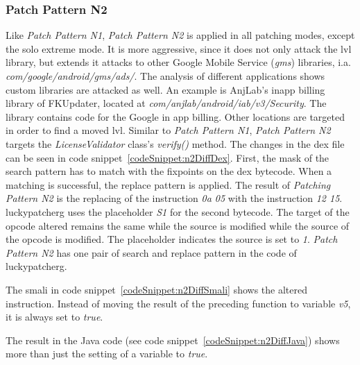 \subsubsection{Patch Pattern N2}
Like \textit{Patch Pattern N1}, \textit{Patch Pattern N2} is applied in all patching modes, except the solo extreme mode.
It is more aggressive, since it does not only attack the \gls{lvl} library, but extends it attacks to other Google Mobile Service (\textit{gms}) libraries, i.a. \textit{com/google/android/gms/ads/}.
The analysis of different applications shows custom libraries are attacked as well.
An example is AnjLab's inapp billing library \cite{inappBilling} of FKUpdater, located at \textit{com/anjlab/android/iab/v3/Security}.
The library contains code for the Google in app billing.
Other locations are targeted in order to find a moved \gls{lvl}.
Similar to \textit{Patch Pattern N1}, \textit{Patch Pattern N2} targets the \textit{LicenseValidator} class's \textit{verify()} method.
\newline
The changes in the \gls{dex} file can be seen in code snippet~\ref{codeSnippet:n2DiffDex}.
First, the mask of the search pattern has to match with the fixpoints on the dex bytecode.
When a matching is successful, the replace pattern is applied.
The result of \textit{Patching Pattern N2} is the replacing of the instruction \textit{0a 05} with the instruction \textit{12 15}.
\gls{luckypatcherg} uses the placeholder \textit{S1} for the second bytecode.
The target of the opcode altered remains the same while the source is modified while the source of the opcode is modified.
The placeholder indicates the source is set to \textit{1}.
\textit{Patch Pattern N2} has one pair of search and replace pattern in the code of \gls{luckypatcherg}.
\newline

The smali in code snippet~\ref{codeSnippet:n2DiffSmali} shows the altered instruction.
Instead of moving the result of the preceding function to variable \textit{v5}, it is always set to \textit{true}.
\newline

The result in the Java code (see code snippet~\ref{codeSnippet:n2DiffJava}) shows more than just the setting of a variable to \textit{true}.
